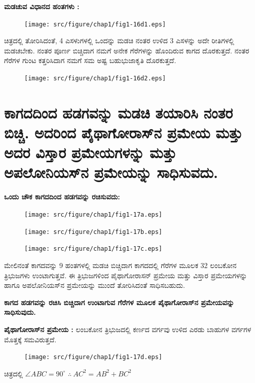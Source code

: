 \vfill\eject


\noindent
\textbf{ಮಡಚುವ ವಿಧಾನದ ಹಂತಗಳು :}
\begin{figure}[H]
\centering
\texttt{[image: src/figure/chap1/fig1-16d1.eps]}
\end{figure}
 
 ಚಿತ್ರದಲ್ಲಿ ತೋರಿಸಿದಂತೆ, 4 ಎಸಳುಗಳಲ್ಲಿ ಒಂದನ್ನು ಮಡಚಿ ನಂತರ ಉಳಿದ 3 ಎಸಳನ್ನು ಅದೇ ರೀತಿಗಳಲ್ಲಿ ಮಡಚಬೇಕು. ನಂತರ ಪೂರ್ಣ ಬಿಚ್ಚಿದಾಗ ನಮಗೆ ಅನೇಕ ಗೆರೆಗಳನ್ನು ಹೊಂದಿರುವ ಕಾಗದ ದೊರಕುತ್ತದೆ. ನಂತರ ಗೆರೆಗಳ ಗುಂಟ ಕತ್ತರಿಸಿದಾಗ ನಮಗೆ ಸಮ ಅಷ್ಟ ಬಹುಭುಜಾಕೃತಿ ದೊರಕುತ್ತದೆ. 
 \begin{figure}[H]
\centering
\texttt{[image: src/figure/chap1/fig1-16d2.eps]}
\end{figure}



\section{ಕಾಗದದಿಂದ ಹಡಗವನ್ನು ಮಡಚಿ ತಯಾರಿಸಿ ನಂತರ ಬಿಚ್ಚಿ. ಅದರಿಂದ ಪೈಥಾಗೋರಾಸ್‌ನ ಪ್ರಮೇಯ ಮತ್ತು ಅದರ ವಿಸ್ತಾರ ಪ್ರಮೇಯಗಳನ್ನು ಮತ್ತು ಅಪಲೋನಿಯಸ್‌ನ ಪ್ರಮೇಯನ್ನು ಸಾಧಿಸುವದು.}\label{sec1.10} %


\eject
\textbf{ಒಂದು ಚೌಕ ಕಾಗದದಿಂದ ಹಡಗವನ್ನು ರಚಿಸುವದು:}
\begin{figure}[H]
\centering
\texttt{[image: src/figure/chap1/fig1-17a.eps]}
\end{figure}
\begin{figure}[H]
\centering
\texttt{[image: src/figure/chap1/fig1-17b.eps]}
\end{figure}
\begin{figure}[H]
\centering
\texttt{[image: src/figure/chap1/fig1-17c.eps]}
\end{figure}

ಮೇಲಿನಂತೆ ಕಾಗದವನ್ನು 9 ಹಂತಗಳಲ್ಲಿ ಮಡಚಿ ಬಿಚ್ಚಿದಾಗ ಕಾಗದದಲ್ಲಿ ಗೆರೆಗಳ ಮೂಲಕ 32 ಲಂಬಕೋನ ತ್ರಿಭುಜಗಳು ಉಂಟಾಗುತ್ತವೆ. ಈ ತ್ರಿಭುಜಗಳಿಂದ ಪೈಥಾಗೋರಾಸನ್ ಪ್ರಮೇಯ ಮತ್ತು ವಿಸ್ತಾರ ಪ್ರಮೇಯಗಳನ್ನು ಹಾಗೂ ಅಪಲೋನಿಯಸ್‌ನ ಪ್ರಮೇಯನ್ನು ಮುಂದೆ ತೋರಿಸಿದಂತೆ ಸಾಧಿಸಬಹುದು. 

\textbf{ಕಾಗದ ಹಡಗವನ್ನು ರಚಿಸಿ ಬಿಚ್ಚಿದಾಗ ಉಂಟಾಗುವ ಗೆರೆಗಳ ಮೂಲಕ ಪೈಥಾಗೋರಾಸ್‌ನ ಪ್ರಮೇಯವನ್ನು ಸಾಧಿಸುವುದು.}

\noindent
\textbf{ಪೈಥಾಗೋರಾಸ್‌ನ ಪ್ರಮೇಯ :} ಲಂಬಕೋನ ತ್ರಿಭುಜದಲ್ಲಿ ಕರ್ಣದ ವರ್ಗವು ಉಳಿದ ಎರಡು ಬಾಹುಗಳ ವರ್ಗಗಳ ಮೊತ್ತಕ್ಕೆ ಸಮವಿರುತ್ತದೆ. 
\begin{figure}[H]
\centering
\texttt{[image: src/figure/chap1/fig1-17d.eps]}
\end{figure}

ಚಿತ್ರದಲ್ಲಿ $\angle ABC = 90^\circ$ $\therefore ~ AC^2 =  AB^2 +  BC^2 $

